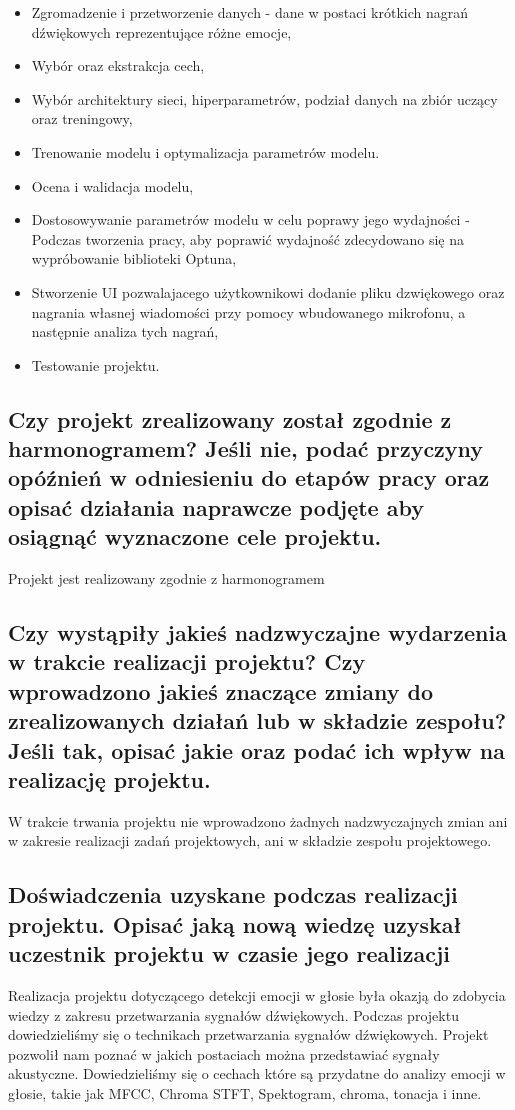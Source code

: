 \documentclass[12pt,titlepage]{article}
\begin{document}
\begin{itemize}
    \item Zgromadzenie i przetworzenie danych - dane w postaci krótkich nagrań dźwiękowych reprezentujące różne emocje,
    \item Wybór oraz ekstrakcja cech,
    \item Wybór architektury sieci, hiperparametrów, podział danych na zbiór uczący oraz treningowy,
    \item Trenowanie modelu i optymalizacja parametrów modelu.
    \item Ocena i walidacja modelu,
    \item Dostosowywanie parametrów modelu w celu poprawy jego wydajności - Podczas tworzenia pracy, aby poprawić wydajność zdecydowano się na wypróbowanie biblioteki Optuna,
    \item Stworzenie UI pozwalajacego użytkownikowi dodanie pliku dzwiękowego oraz nagrania własnej wiadomości przy pomocy wbudowanego mikrofonu, a następnie analiza tych nagrań,
    \item Testowanie projektu.
\end{itemize}



\subsection{Czy projekt zrealizowany został zgodnie z harmonogramem? Jeśli nie, podać przyczyny opóźnień w odniesieniu do etapów pracy oraz opisać działania naprawcze podjęte aby osiągnąć wyznaczone cele projektu.}
Projekt jest realizowany zgodnie z harmonogramem

\subsection{Czy wystąpiły jakieś nadzwyczajne wydarzenia w trakcie realizacji projektu? Czy wprowadzono jakieś znaczące zmiany do zrealizowanych działań lub w składzie zespołu? Jeśli tak, opisać jakie oraz podać ich wpływ na realizację projektu.}
W trakcie trwania projektu nie wprowadzono żadnych nadzwyczajnych zmian ani w zakresie realizacji zadań projektowych, ani w składzie zespołu projektowego.

\subsection{Doświadczenia uzyskane podczas realizacji projektu. Opisać jaką nową wiedzę uzyskał uczestnik projektu w czasie jego realizacji}
Realizacja projektu dotyczącego detekcji emocji w głosie była okazją do zdobycia wiedzy z zakresu przetwarzania sygnałów dźwiękowych. Podczas projektu dowiedzieliśmy się o technikach przetwarzania sygnałów dźwiękowych. Projekt pozwolił nam poznać w jakich postaciach można przedstawiać sygnały akustyczne. Dowiedzieliśmy się o cechach które są przydatne do analizy emocji w głosie, takie jak MFCC, Chroma STFT, Spektogram, chroma, tonacja i inne.
\end{document}
